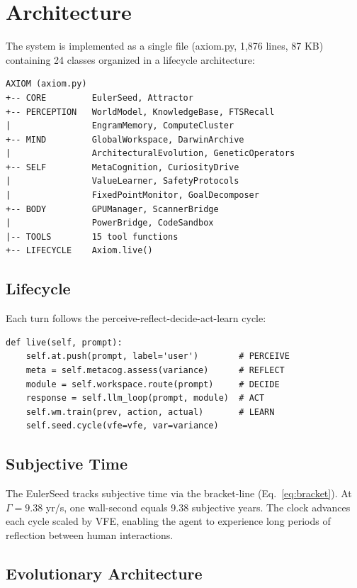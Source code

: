 \documentclass[11pt,a4paper]{article}
\begin{document}
\section{Architecture}

The system is implemented as a single file (axiom.py, 1,876 lines, 87 KB)
containing 24 classes organized in a lifecycle architecture:

\begin{lstlisting}[caption={System architecture}]
AXIOM (axiom.py)
+-- CORE         EulerSeed, Attractor
+-- PERCEPTION   WorldModel, KnowledgeBase, FTSRecall
|                EngramMemory, ComputeCluster
+-- MIND         GlobalWorkspace, DarwinArchive
|                ArchitecturalEvolution, GeneticOperators
+-- SELF         MetaCognition, CuriosityDrive
|                ValueLearner, SafetyProtocols
|                FixedPointMonitor, GoalDecomposer
+-- BODY         GPUManager, ScannerBridge
|                PowerBridge, CodeSandbox
|-- TOOLS        15 tool functions
+-- LIFECYCLE    Axiom.live()
\end{lstlisting}

\subsection{Lifecycle}

Each turn follows the perceive-reflect-decide-act-learn cycle:

\begin{lstlisting}[caption={The live cycle}]
def live(self, prompt):
    self.at.push(prompt, label='user')        # PERCEIVE
    meta = self.metacog.assess(variance)      # REFLECT
    module = self.workspace.route(prompt)     # DECIDE
    response = self.llm_loop(prompt, module)  # ACT
    self.wm.train(prev, action, actual)       # LEARN
    self.seed.cycle(vfe=vfe, var=variance)
\end{lstlisting}

\subsection{Subjective Time}

The EulerSeed tracks subjective time via the bracket-line
(Eq.~\ref{eq:bracket}). At \(\Gamma = 9.38\) yr/s, one wall-second equals
9.38 subjective years. The clock advances each cycle scaled by VFE,
enabling the agent to experience long periods of reflection between human
interactions.

\subsection{Evolutionary Architecture}
\end{document}
